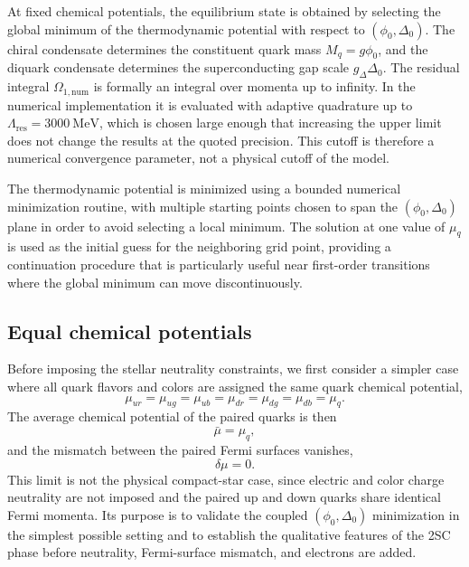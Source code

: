 At fixed chemical potentials, the equilibrium state is obtained by
selecting the global minimum of the thermodynamic potential with
respect to \((\phi_0,\Delta_0)\). The chiral condensate determines the
constituent quark mass \(M_q = g\phi_0\), and the diquark condensate
determines the superconducting gap scale \(g_\Delta\Delta_0\). The
residual integral \(\Omega_{1,\mathrm{num}}\) is formally an integral
over momenta up to infinity. In the numerical implementation it is
evaluated with adaptive quadrature up to
\(\Lambda_\mathrm{res}=3000~\mathrm{MeV}\), which is chosen large
enough that increasing the upper limit does not change the results at
the quoted precision. This cutoff is therefore a numerical convergence
parameter, not a physical cutoff of the model.

The thermodynamic potential is minimized using a bounded numerical
minimization routine, with multiple starting points chosen to span the
\((\phi_0,\Delta_0)\) plane in order to avoid selecting a local minimum.
The solution at one value of \(\mu_q\) is used as the initial guess for
the neighboring grid point, providing a continuation procedure that is
particularly useful near first-order transitions where the global
minimum can move discontinuously.

\subsection*{Equal chemical potentials}
\label{subsec:qmd_benchmark}

Before imposing the stellar neutrality constraints, we first consider a
simpler case where all quark flavors and colors are assigned the same quark
chemical potential,
\begin{equation}
\mu_{ur}=\mu_{ug}=\mu_{ub}=\mu_{dr}=\mu_{dg}=\mu_{db}=\mu_q.
\end{equation}
The average chemical potential of the paired quarks is then
\begin{equation}
\bar{\mu}=\mu_q,
\end{equation}
and the mismatch between the paired Fermi surfaces vanishes,
\begin{equation}
\delta\mu=0.
\end{equation}
This limit is not the physical compact-star case, since electric and
color charge neutrality are not imposed and the paired up and down quarks share
identical Fermi momenta. Its purpose is to validate the coupled
\((\phi_0,\Delta_0)\) minimization in the simplest possible setting and
to establish the qualitative features of the 2SC phase before neutrality,
Fermi-surface mismatch, and electrons are added.

